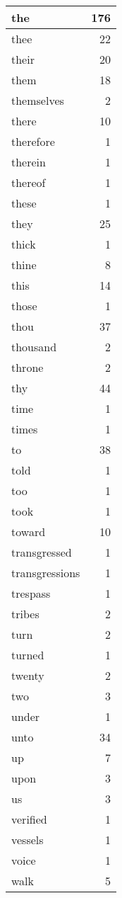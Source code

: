 \begin{center}
\begin{longtable}{l|r}
the & 176 \\ \hline
thee & 22 \\ \hline
their & 20 \\ \hline
them & 18 \\ \hline
themselves & 2 \\ \hline
there & 10 \\ \hline
therefore & 1 \\ \hline
therein & 1 \\ \hline
thereof & 1 \\ \hline
these & 1 \\ \hline
they & 25 \\ \hline
thick & 1 \\ \hline
thine & 8 \\ \hline
this & 14 \\ \hline
those & 1 \\ \hline
thou & 37 \\ \hline
thousand & 2 \\ \hline
throne & 2 \\ \hline
thy & 44 \\ \hline
time & 1 \\ \hline
times & 1 \\ \hline
to & 38 \\ \hline
told & 1 \\ \hline
too & 1 \\ \hline
took & 1 \\ \hline
toward & 10 \\ \hline
transgressed & 1 \\ \hline
transgressions & 1 \\ \hline
trespass & 1 \\ \hline
tribes & 2 \\ \hline
turn & 2 \\ \hline
turned & 1 \\ \hline
twenty & 2 \\ \hline
two & 3 \\ \hline
under & 1 \\ \hline
unto & 34 \\ \hline
up & 7 \\ \hline
upon & 3 \\ \hline
us & 3 \\ \hline
verified & 1 \\ \hline
vessels & 1 \\ \hline
voice & 1 \\ \hline
walk & 5 \\ \hline

\end{longtable}
\end{center}
